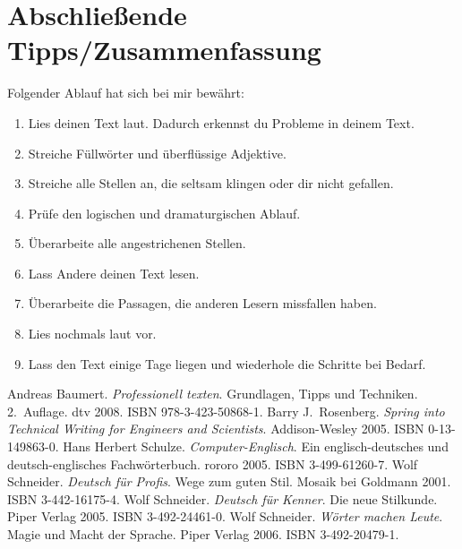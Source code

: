 \documentclass[a4paper,titlepage=true,twoside]{scrartcl}
\newcommand{\gquote}[1]{\glqq #1\grqq}
\begin{document}
\section{Abschließende Tipps/Zusammenfassung}
Folgender Ablauf hat sich bei mir bewährt:

\begin{enumerate}
 \item Lies deinen Text laut. Dadurch erkennst du Probleme in deinem Text.
 \item Streiche Füllwörter und überflüssige Adjektive.
 \item Streiche alle Stellen an, die seltsam klingen oder dir nicht gefallen.
 \item Prüfe den logischen und \gquote{dramaturgischen}  Ablauf.
 \item Überarbeite alle angestrichenen Stellen.
 \item Lass Andere deinen Text lesen.
 \item Überarbeite die Passagen, die anderen Lesern missfallen haben.
 \item Lies nochmals laut vor.
 \item Lass den Text einige Tage liegen und wiederhole die Schritte bei Bedarf.
\end{enumerate}




\begin{thebibliography}{baum08}
  Andreas Baumert. \emph{Professionell texten}. Grundlagen, Tipps und
Techniken. 2.~Auflage. dtv 2008. ISBN 978-3-423-50868-1.
  Barry J.\ Rosenberg.
\emph{Spring into Technical Writing for Engineers and Scientists}.
Addison-Wesley 2005. ISBN 0-13-149863-0.
  Hans Herbert Schulze. \emph{Computer-Englisch}.
Ein englisch-deutsches und deutsch-englisches
Fachwörterbuch. rororo 2005. ISBN 3-499-61260-7.
  Wolf Schneider. \emph{Deutsch für Profis}.
Wege zum guten Stil. Mosaik bei Goldmann 2001. ISBN 3-442-16175-4.
  Wolf Schneider. \emph{Deutsch für Kenner}.
Die neue Stilkunde. Piper Verlag 2005. ISBN 3-492-24461-0.
  Wolf Schneider. \emph{Wörter machen Leute}.
Magie und Macht der Sprache. Piper Verlag 2006. ISBN 3-492-20479-1.
\end{thebibliography}

\end{document}
